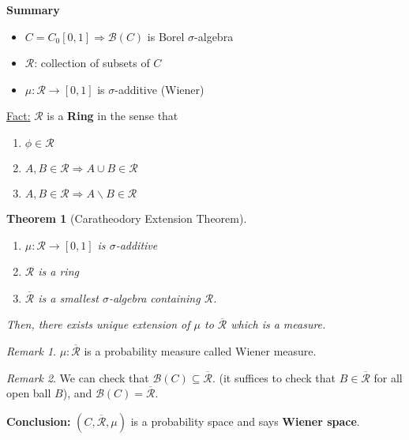 \documentclass[12pt]{report}
\renewcommand{\1}{\mathbb{1}}
\renewcommand{\subset}{\subseteq}
\theoremstyle{break}
\newtheorem{thm}{Theorem}[section] %
\theoremstyle{newdef}
\theoremstyle{remark}
\newtheorem*{rem}{Remark} %
\begin{document}
\textbf{Summary}
\begin{itemize}
\item $C = C_0[0,1] \Rightarrow \mathcal{B}(C)$ is Borel $\sigma$-algebra
\item $\mathcal{R}$: collection of subsets of $C$
\item $\mu : \mathcal{R} \rightarrow [0,1]$ is $\sigma$-additive (Wiener)
\end{itemize}

\underline{Fact:} $\mathcal{R}$ is a \textbf{Ring} in the sense that
\begin{enumerate}
\item $\phi \in \mathcal{R}$
\item $A, B \in \mathcal{R} \Rightarrow A \cup B \in \mathcal{R}$
\item $A, B \in \mathcal{R} \Rightarrow A \backslash B \in \mathcal{R}$
\end{enumerate}

\begin{thm}[Caratheodory Extension Theorem]
\leavevmode
\vspace{-6mm}
\begin{enumerate}
\item $\mu : \mathcal{R} \rightarrow [0,1]$ is $\sigma$-additive
\item $\mathcal{R}$ is a ring
\item $\overline{\mathcal{R}}$ is a smallest $\sigma$-algebra containing $\mathcal{R}$.
\end{enumerate}
Then, there exists unique extension of $\mu$ to $\overline{\mathcal{R}}$ which is a measure.
\end{thm}


\begin{rem}
$\mu : \overline{\mathcal{R}}$ is a probability measure called Wiener measure.
\end{rem}
\begin{rem}
We can check that $\mathcal{B}(C) \subset \overline{\mathcal{R}}$. (it suffices to check that $B\in\overline{\mathcal{R}}$ for all open ball $B$), and $\mathcal{B}(C) = \overline{\mathcal{R}}$.
\end{rem}



\textbf{Conclusion:} $(C,\overline{\mathcal{R}}, \mu)$ is a probability space and says \textbf{Wiener space}.
\end{document}
